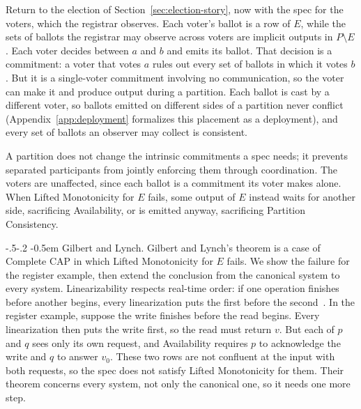 \documentclass[sigconf]{cidr-2027}
\makeatletter
\theoremstyle{remark}
\renewcommand\paragraph{\@startsection{paragraph}{4}{\z@}%
  {-.5\baselineskip \@plus -2\p@ \@minus -.2\p@}%
  {-0.5em}%
  {\normalfont\bfseries}}
\newcommand{\commitment}{commitment\xspace}
\newcommand{\commitments}{commitments\xspace}
\makeatother
\begin{document}
\textcolor{reviewed}{Return to the election of Section~\ref{sec:election-story}, now with the spec
for the voters, which the registrar observes.} Each voter's ballot is a row of $E$, while the sets of ballots the
registrar may observe across voters are implicit outputs in $P\setminus E$. Each voter decides between $a$ and $b$ and emits its ballot. That decision is
a \commitment: a voter that votes $a$ rules out every set of ballots in which
it votes $b$. \textcolor{reviewed}{But it is a single-voter \commitment involving no
communication, so the voter can make it and produce output during a partition.} Each ballot is cast by a different voter, so ballots emitted on different
sides of a partition never conflict (Appendix~\ref{app:deployment} formalizes this
placement as a deployment), and every set of ballots an
observer may collect is consistent.

\textcolor{reviewed}{A partition does not change the intrinsic \commitments a spec needs; it
prevents separated participants from jointly enforcing them through
coordination.} The voters are unaffected, since each ballot is a \commitment
its voter makes alone. \textcolor{reviewed}{When Lifted Monotonicity for $E$ fails, some output of
$E$ instead waits for another side, sacrificing Availability, or is emitted
anyway, sacrificing Partition Consistency.}

\paragraph{Gilbert and Lynch.}
\textcolor{reviewed}{Gilbert and Lynch's theorem is a case of Complete CAP in which Lifted Monotonicity for $E$ fails.} \textcolor{reviewed}{We show the failure for the register example, then extend the conclusion from the canonical system to every system.} Linearizability
respects real-time order: if one operation finishes before another begins,
every linearization puts the first before the
second~\cite{herlihy1990linearizability}. In the register example, suppose the
write finishes before the read begins. \textcolor{reviewed}{Every linearization then puts the write
first, so the read must return $v$.} \textcolor{reviewed}{But each of $p$ and $q$ sees only its own
request, and Availability requires $p$ to acknowledge the write and $q$ to
answer $v_0$.} \textcolor{reviewed}{These two rows are not confluent at the input with both requests, so
the spec does not satisfy Lifted Monotonicity for them.} \textcolor{reviewed}{Their theorem
concerns every system, not only the canonical one, so it needs one more step.}
\end{document}
